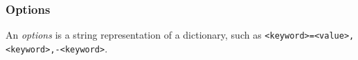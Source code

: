 \subsubsection{Options}
\label{options}

An \emph{options} is a string representation of a dictionary, such as \texttt{<keyword>=<value>,<keyword>,-<keyword>}.